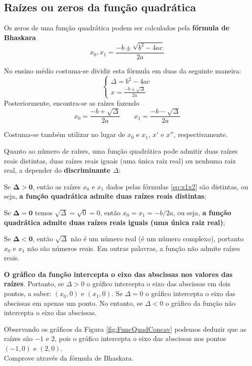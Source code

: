 \documentclass[../main.tex]{subfiles}
\begin{document}
\subsection{Raízes ou zeros da função quadrática}\label{subsec:FuncQuad-zeros}
Os zeros de uma função quadrática podem ser calculados pela \textbf{fórmula de Bhaskara}
\begin{equation}\label{eq:Bhaskara}
  x_0, x_1 = \frac{-b \pm \sqrt{b^2 - 4ac}}{2a}
\end{equation}

No ensino médio costuma-se dividir esta fórmula em duas da seguinte maneira:
\begin{equation}
\left\{\begin{array}{l} 
\Delta =b^2-4ac\\ x=\frac{-b\pm\sqrt{\Delta}}{2a}\end{array}\right.\label{eq:FormBaskDiv}
\end{equation}
Posteriormente, encontra-se as raízes fazendo 
\begin{equation}
   x_0=\frac{-b+\sqrt{\Delta}}{2a}\qquad x_1=\frac{-b-\sqrt{\Delta}}{2a}\label{eq:x1x2} 
\end{equation}

\begin{obs}
  Costuma-se também utilizar  no lugar de $x_0$ e $x_1$, $x'$ e $x''$, respectivamente.
\end{obs}
Quanto ao número de raízes, uma função quadrática pode admitir duas raízes reais distintas, duas raízes reais iguais (uma única raiz real) ou nenhuma raiz real, a depender do \textbf{discriminante $\Delta$}:
\begin{compactenum}[(i)]
\item Se $\boldsymbol{\Delta>0}$, então as raízes $x_0$ e $x_1$ dados pelas fórmulas \ref{eq:x1x2} são distintas, ou seja, \textbf{a função quadrática admite duas raízes reais distintas};
\item Se $\boldsymbol{\Delta=0}$ temos $\sqrt{\Delta}=\sqrt{0}=0$, então  $x_0=x_1=-b/2a$, ou seja, \textbf{a função quadrática admite duas raízes reais iguais (uma única raiz real)};
\item Se $\boldsymbol{\Delta<0}$, então $\sqrt{\Delta}$ não é um número real (é um número complexo), portanto $x_0$ e $x_1$ não são números reais. Em outras palavras, a função não admite raízes reais.
\end{compactenum}
\begin{obs}
 \textbf{ O gráfico da função intercepta o eixo das abscissas  nos valores das raízes}. Portanto, se $\Delta>0$ o gráfico intercepta o eixo das abscissas  em dois pontos, a saber: $(x_0,0)$ e $(x_1,0)$. Se $\Delta=0$ o gráfico intercepta o eixo das abscissas em apenas um ponto. No entanto, se $\Delta<0$ o gráfico da função não intercepta o eixo das abscissas.
\end{obs}
Observando os gráficos da Figura  \ref{fig:FuncQuadConcav} podemos deduzir que as raízes são $-1$ e $2$, pois o gráfico intercepta o eixo das abscissas nos pontos $(-1,0)$ e $(2,0)$.\\ \dica Comprove através da fórmula de Bhaskara.
\end{document}
